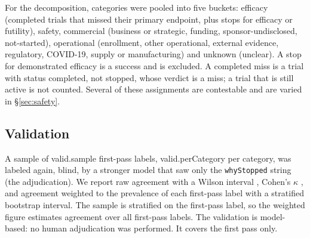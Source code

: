 \documentclass[11pt]{article}
\newcommand{\code}[1]{\texttt{\small #1}}
\begin{document}
For the decomposition, categories were pooled into five buckets: efficacy (completed trials that missed their primary endpoint, plus stops for efficacy or futility), safety, commercial (business or strategic, funding, sponsor-undisclosed, not-started), operational (enrollment, other operational, external evidence, regulatory, \mbox{COVID-19}, supply or manufacturing) and unknown (unclear). A stop for demonstrated efficacy is a success and is excluded. A completed miss is a trial with status completed, not stopped, whose verdict is a miss; a trial that is still active is not counted. Several of these assignments are contestable and are varied in \S\ref{sec:safety}.

\subsection{Validation}\label{sec:validation-methods}
A sample of \num{valid.sample} first-pass labels, \num{valid.perCategory} per category, was labeled again, blind, by a stronger model that saw only the \code{whyStopped} string (the adjudication). We report raw agreement with a Wilson interval \cite{brown2001}, Cohen's $\kappa$ \cite{cohen1960}, and agreement weighted to the prevalence of each first-pass label with a stratified bootstrap interval. The sample is stratified on the first-pass label, so the weighted figure estimates agreement over all first-pass labels. The validation is model-based: no human adjudication was performed. It covers the first pass only.
\end{document}
